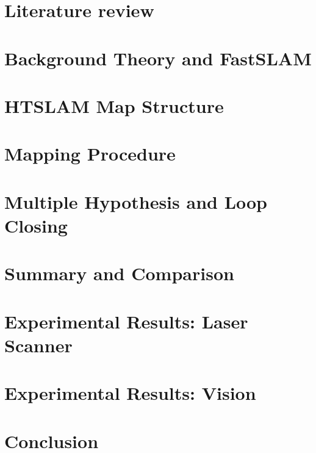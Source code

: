 \documentclass[11pt,onecolum,a4paper,oneside]{book}
\begin{document}

\tableofcontents
\listoffigures


\chapter{Literature review}



\chapter{Background Theory and FastSLAM}
\label{chpt:Overview}



\chapter{HTSLAM Map Structure}
\label{chpt:MapStructure}


\chapter{Mapping Procedure}
\label{chpt:Mapping}


\chapter{Multiple Hypothesis and Loop Closing}
\label{chpt:LoopClosing}


\chapter{Summary and Comparison}


\chapter{Experimental Results: Laser Scanner}
\label{chpt:Laser_Results}


\chapter{Experimental Results: Vision}
\label{chpt:Vision_Results}


\chapter{Conclusion}




\end{document}
